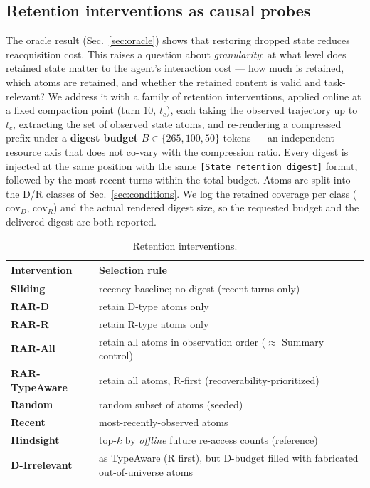 \documentclass[11pt]{article}
\begin{document}
\subsection{Retention interventions as causal probes}
\label{sec:retention}

The oracle result (Sec.~\ref{sec:oracle}) shows that restoring dropped state reduces reacquisition cost.
This raises a question about \emph{granularity}: at what level does retained state matter to
the agent's interaction cost --- how much is retained, which atoms are retained, and whether
the retained content is valid and task-relevant? We address it with a family of retention
interventions, applied online at a fixed compaction point (turn 10, $t_c$), each taking
the observed trajectory up to $t_c$, extracting the set of observed state atoms, and
re-rendering a compressed prefix under a \textbf{digest budget} $B \in \{265, 100, 50\}$
tokens --- an independent resource axis that does not co-vary with the compression ratio.
Every digest is injected at the same position with the same \texttt{[State retention digest]}
format, followed by the most recent turns within the total budget. Atoms are split into
the D/R classes of Sec.~\ref{sec:conditions}. We log the retained coverage per class ($\mathrm{cov}_D$,
$\mathrm{cov}_R$) and the actual rendered digest size, so the requested budget and the
delivered digest are both reported.

\begin{table}[t]
\centering
\small
\caption{Retention interventions.}
\label{tab:interventions}
\begin{tabular}{@{}>{\raggedright\arraybackslash}p{2.6cm}>{\raggedright\arraybackslash}p{12.8cm}@{}}
\toprule
\textbf{Intervention} & \textbf{Selection rule} \\
\midrule
\textbf{Sliding} & recency baseline; no digest (recent turns only) \\
\textbf{RAR-D} & retain D-type atoms only \\
\textbf{RAR-R} & retain R-type atoms only \\
\textbf{RAR-All} & retain all atoms in observation order ($\approx$ Summary control) \\
\textbf{RAR-TypeAware} & retain all atoms, R-first (recoverability-prioritized) \\
\textbf{Random} & random subset of atoms (seeded) \\
\textbf{Recent} & most-recently-observed atoms \\
\textbf{Hindsight} & top-$k$ by \emph{offline} future re-access counts (reference) \\
\textbf{D-Irrelevant} & as TypeAware (R first), but D-budget filled with fabricated out-of-universe atoms \\
\bottomrule
\end{tabular}
\end{table}
\end{document}

